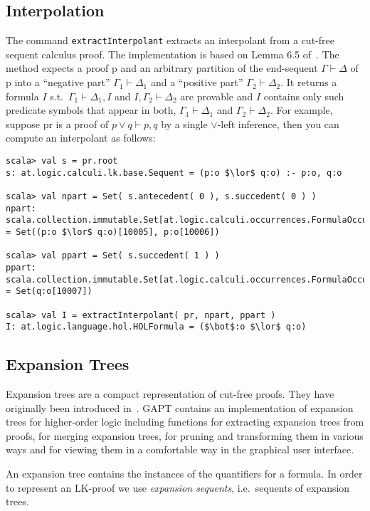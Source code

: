 \documentclass[a4paper,11pt]{article}
\newcommand{\seq}{\vdash}	%
\renewcommand{\lor}{\vee}
\begin{document}
\subsection{Interpolation}

The command \texttt{extractInterpolant} extracts an interpolant from a cut-free
sequent calculus proof. The implementation is based on Lemma 6.5 of~\cite{Takeuti87Proof}. The method expects
a proof p and an arbitrary partition of the end-sequent $\Gamma \seq \Delta$ of p into a 
``negative part'' $\Gamma_1\seq\Delta_1$ and a ``positive part'' $\Gamma_2 \seq \Delta_2$.
It returns a formula $I$ s.t.\ $\Gamma_1\seq\Delta_1, I$ and $I,\Gamma_2\seq\Delta_2$
are provable and $I$ contains only such predicate symbols that appear in both, $\Gamma_1\seq\Delta_1$
and $\Gamma_2\seq\Delta_2$. For example, suppose pr is a proof of $p \lor q \seq p, q$
by a single $\lor$-left inference, then you can compute an interpolant as follows:
\begin{lstlisting}
scala> val s = pr.root
s: at.logic.calculi.lk.base.Sequent = (p:o $\lor$ q:o) :- p:o, q:o

scala> val npart = Set( s.antecedent( 0 ), s.succedent( 0 ) )
npart: scala.collection.immutable.Set[at.logic.calculi.occurrences.FormulaOccurrence] = Set((p:o $\lor$ q:o)[10005], p:o[10006])

scala> val ppart = Set( s.succedent( 1 ) )
ppart: scala.collection.immutable.Set[at.logic.calculi.occurrences.FormulaOccurrence] = Set(q:o[10007])

scala> val I = extractInterpolant( pr, npart, ppart )
I: at.logic.language.hol.HOLFormula = ($\bot$:o $\lor$ q:o)
\end{lstlisting}

\subsection{Expansion Trees}

Expansion trees are a compact representation of cut-free proofs. They have originally been
introduced in~\cite{Miller87Compact}. GAPT contains an implementation of
expansion trees for higher-order logic including functions for extracting expansion
trees from proofs, for merging expansion trees, for pruning and transforming them
in various ways and for viewing
them in a comfortable way in the graphical user interface.

An expansion tree contains the instances of the quantifiers for a formula. In order
to represent an LK-proof we use {\em expansion sequents}, i.e.~sequents of expansion trees.
\end{document}
